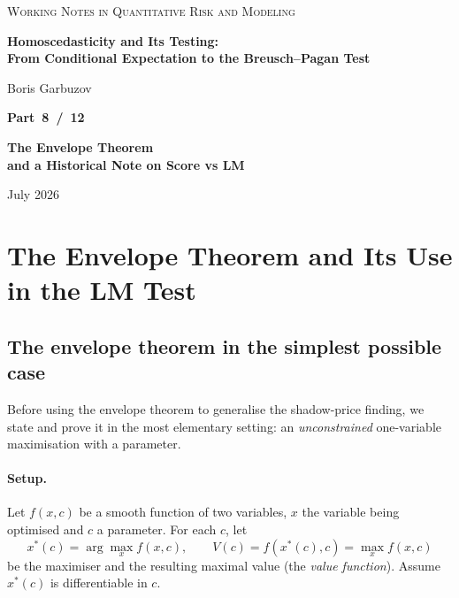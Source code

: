 \documentclass[a4paper,oneside,12pt]{extarticle}
\theoremstyle{plain}
\theoremstyle{definition}
\theoremstyle{remark}
\begin{document}
\begin{titlepage}
\begin{center}

{\footnotesize\scshape\color{gray}
Working Notes in Quantitative Risk and Modeling
}

\vfill

{\LARGE\bfseries Homoscedasticity and Its Testing:\\[4pt]
From Conditional Expectation to the Breusch--Pagan Test}

\vspace{36pt}

{\normalsize Boris Garbuzov}

\vfill

{\Large\bfseries Part~8~/~12}

\vspace{6pt}

{\Large\bfseries The Envelope Theorem\\and a Historical Note on Score vs LM}

\vfill

{\small July 2026}

\end{center}
\end{titlepage}

\setcounter{tocdepth}{2}
\tableofcontents
\newpage

\section{The Envelope Theorem and Its Use in the LM Test}
\label{sec:envelope_lm}

\subsection{The envelope theorem in the simplest possible case}
\label{subsec:envelope_simple}

Before using the envelope theorem to generalise the shadow-price
finding, we state and prove it in the most elementary setting:
an \emph{unconstrained} one-variable maximisation with a parameter.

\paragraph{Setup.}
Let $f(x,c)$ be a smooth function of two variables, $x$ the variable
being optimised and $c$ a parameter.  For each $c$, let
\[
  x^*(c) = \arg\max_x f(x,c), \qquad
  V(c) = f(x^*(c), c) = \max_x f(x,c)
\]
be the maximiser and the resulting maximal value (the
\emph{value function}).  Assume $x^*(c)$ is differentiable in $c$.
\end{document}
